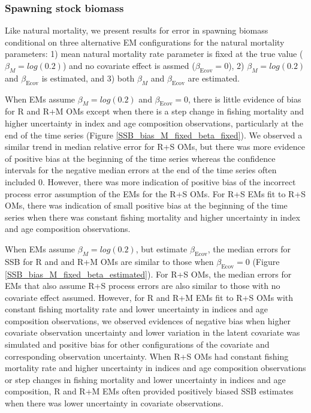 \documentclass[
  12pt,
]{article}
\begin{document}
\hypertarget{spawning-stock-biomass}{%
\subsubsection*{Spawning stock biomass}\label{spawning-stock-biomass}}

Like natural mortality, we present results for error in spawning biomass
conditional on three alternative EM configurations for the natural
mortality parameters: 1) mean natural mortality rate parameter is fixed
at the true value (\(\beta_M = log(0.2)\)) and no covariate effect is
assmed (\(\beta_\text{Ecov} = 0\)), 2) \(\beta_M = log(0.2)\) and
\(\beta_\text{Ecov}\) is estimated, and 3) both \(\beta_M\) and
\(\beta_\text{Ecov}\) are estimated.

When EMs assume \(\beta_M = log(0.2)\) and \(\beta_\text{Ecov} = 0\),
there is little evidence of bias for R and R+M OMs except when there is
a step change in fishing mortality and higher uncertainty in index and
age composition observations, particularly at the end of the time series
(Figure \ref{SSB_bias_M_fixed_beta_fixed}). We observed a similar trend
in median relative error for R+S OMs, but there was more evidence of
positive bias at the beginning of the time series whereas the confidence
intervals for the negative median errors at the end of the time series
often included 0. However, there was more indication of positive bias of
the incorrect process error assumption of the EMs for the R+S OMs. For
R+S EMs fit to R+S OMs, there was indication of small positive bias at
the beginning of the time series when there was constant fishing
mortality and higher uncertainty in index and age composition
observations.

When EMs assume \(\beta_M = log(0.2)\), but estimate
\(\beta_\text{Ecov}\), the median errors for SSB for R and and R+M OMs
are similar to those when \(\beta_\text{Ecov} = 0\) (Figure
\ref{SSB_bias_M_fixed_beta_estimated}). For R+S OMs, the median errors
for EMs that also assume R+S process errors are also similar to those
with no covariate effect assumed. However, for R and R+M EMs fit to R+S
OMs with constant fishing mortality rate and lower uncertainty in
indices and age composition observations, we observed evidences of
negative bias when higher covariate observation uncertainty and lower
variation in the latent covariate was simulated and positive bias for
other configurations of the covariate and corresponding observation
uncertainty. When R+S OMs had constant fishing mortality rate and higher
uncertainty in indices and age composition observations or step changes
in fishing mortality and lower uncertainty in indices and age
composition, R and R+M EMs often provided positively biased SSB
estimates when there was lower uncertainty in covariate observations.
\end{document}
